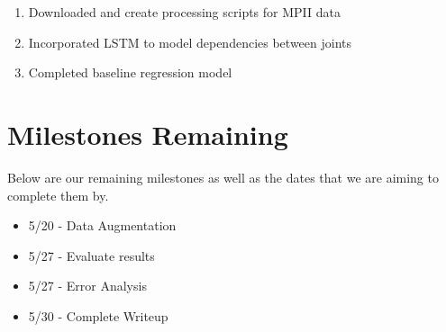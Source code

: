 \documentclass[12pt]{article}
\begin{document}
\begin{enumerate}
\item Downloaded and create processing scripts for MPII data
\item Incorporated LSTM to model dependencies between joints
\item Completed baseline regression model
\end{enumerate}

\section{Milestones Remaining}

Below are our remaining milestones as well as the dates that we are aiming to complete them by.

\begin{itemize}
\item 5/20 - Data Augmentation
\item 5/27 - Evaluate results
\item 5/27 - Error Analysis
\item 5/30 - Complete Writeup
\end{itemize}

\nocite{*}


\end{document}
